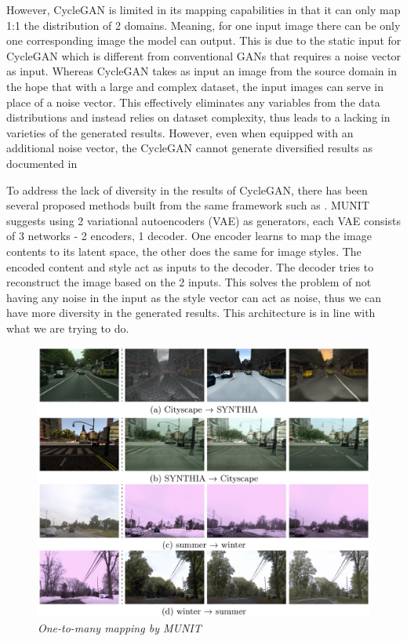 \documentclass[12pt]{report}
\begin{document}
However, CycleGAN is limited in its mapping capabilities in that it can only map 1:1 the distribution of 2 domains. Meaning, for one input image there can be only one corresponding image the model can output. This is due to the static input for CycleGAN which is different from conventional GANs that requires a noise vector as input. Whereas CycleGAN takes as input an image from the source domain in the hope that with a large and complex dataset, the input images can serve in place of a noise vector. This effectively eliminates any variables from the data distributions and instead relies on dataset complexity, thus leads to a lacking in varieties of the generated results. However, even when equipped with an additional noise vector, the CycleGAN cannot generate diversified results as documented in \cite{augmented-cyclegan}

To address the lack of diversity in the results of CycleGAN, there has been several proposed methods built from the same framework such as \cite{munit}\cite{bicycle-gan}\cite{disco-gan}\cite{bayesian-cyclegan}. MUNIT\cite{munit} suggests using 2 variational autoencoders (VAE) as generators, each VAE consists of 3 networks - 2 encoders, 1 decoder. One encoder learns to map the image contents to its latent space, the other does the same for image styles. The encoded content and style act as inputs to the decoder. The decoder tries to reconstruct the image based on the 2 inputs. This solves the problem of not having any noise in the input as the style vector can act as noise, thus we can have more diversity in the generated results. This architecture is in line with what we are trying to do.

\begin{figure}[h]
	\centering
	\includegraphics[scale=0.2]{street-munit}
	\caption{\textit{One-to-many mapping by MUNIT\cite{munit}}}
	\label{fig:street-munit}
\end{figure}
\end{document}
